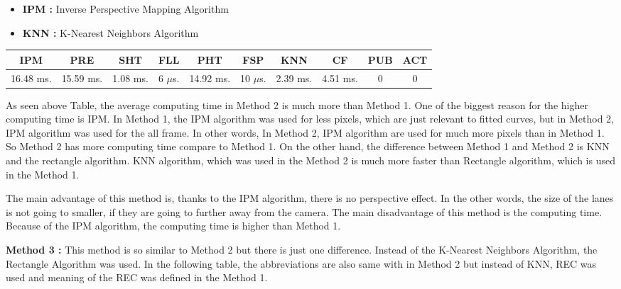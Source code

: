 \begin{itemize}[noitemsep]
\item\textbf{IPM : }Inverse Perspective Mapping Algorithm
\item\textbf{KNN : }K-Nearest Neighbors Algorithm
\end{itemize}

\begin{center}
  \begin{tabular}{ | c | c | c | c | c | c | c | c | c | c |}
    \hline
  
  IPM 		& PRE 		& SHT	   & FLL 	   & PHT 	   & FSP 	    & KNN 	   & CF 	  & PUB 	& ACT \\ \hline  
  16.48 ms. & 15.59 ms. & 1.08 ms. & 6 $\mu$s. & 14.92 ms. & 10 $\mu$s. & 2.39 ms. & 4.51 ms. & 0       & 0   \\ \hline  
    
    
      \end{tabular}
  \label{tab:Case2_Times}
\end{center}

As seen above Table, the average computing time in Method 2 is much more than Method 1. One of the biggest reason for the higher computing time is IPM. In Method 1, the IPM algorithm was used for less pixels, which are just relevant to fitted curves, but in Method 2, IPM algorithm was used for the all frame. In other words, In Method 2, IPM algorithm are used for much more pixels than in Method 1. So Method 2 has more computing time compare to Method 1. On the other hand, the difference between Method 1 and Method 2 is KNN and the rectangle algorithm. KNN algorithm, which was used in the Method 2 is much more faster than Rectangle algorithm, which is used in the Method 1. 

The main advantage of this method is, thanks to the IPM algorithm, there is no perspective effect. In the other words, the size of the lanes is not going to smaller, if they are going to further away from the camera. The main disadvantage of this method is the computing time. Because of the IPM algorithm, the computing time is higher than Method 1.



\textbf{Method 3 : }This method is so similar to Method 2 but there is just one difference. Instead of the K-Nearest Neighbors Algorithm, the Rectangle Algorithm was used. In the following table, the abbreviations are also same with in Method 2 but instead of KNN, REC was used and meaning of the REC was defined in the Method 1.


